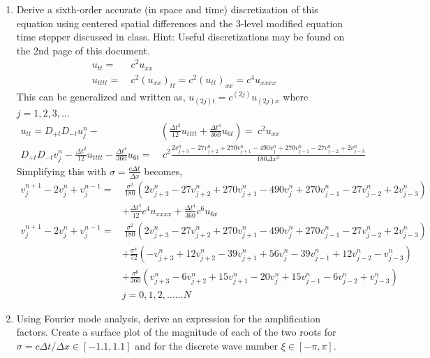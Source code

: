 \documentclass[11pt]{article}
\newcommand{\Dpt}{D_{+t}}
\newcommand{\Dmt}{D_{-t}}
\newcommand{\dx}{\Delta x}
\newcommand{\dt}{\Delta t}
\newcommand{\dis}[3]{{#1}^{#2}_{#3}}
\newcommand{\vd}[2]{v^{#1}_{#2}}
\newcommand{\vnd}[1]{v^{n}_{#1}}
\newcommand{\bra}[1]{\left(#1\right)}
\begin{document}
\begin{enumerate}
    \begin{enumerate}
      \item {\color{blue}Derive a sixth-order accurate (in space and time) discretization of this equation using centered spatial differences and the 3-level modified equation time stepper discussed in class. Hint: Useful discretizations may be found on the 2nd page of this document.}
      \begin{align*}
          u_{tt} =& \ c^2 u_{xx} \\
          u_{tttt} =& \ c^2 \bra{u_{xx}}_{tt} = c^2 \bra{u_{tt}}_{xx} = c^4 u_{xxxx}
      \end{align*}
      This can be generalized and written as, $u_{(2j)t} = c^{(2j)}u_{(2j)x}$ where $j=1,2,3,...$
      \begin{align*}
          u_{tt} = \Dpt\Dmt\dis{u}{n}{j}- &\bra{\frac{\dt^2}{12}u_{tttt}+\frac{\dt^4}{360}u_{6t}} = \ c^2 u_{xx} \\
          \Dpt\Dmt \dis{v}{n}{j} - \frac{\dt^2}{12}u_{tttt}-\frac{\dt^4}{360}u_{6t} =& \ c^2 \frac{2\vd{n}{j+3}-27\vd{n}{j+2}+270\vd{n}{j+1}-490\vd{n}{j}+270\vd{n}{j-1}-27\vd{n}{j-2}+2\vd{n}{j-3}}{180\dx^2}
      \end{align*}
      Simplifying this with $\sigma = \frac{c\dt}{\dx}$ becomes,
      \begin{align*}
          \vd{n+1}{j}-2\vnd{j}+\vd{n-1}{j} =& \ \frac{\sigma^2}{180}\bra{2\vd{n}{j+3}-27\vd{n}{j+2}+270\vd{n}{j+1}-490\vd{n}{j}+270\vd{n}{j-1}-27\vd{n}{j-2}+2\vd{n}{j-3}} \\
          & + \frac{\dt^2}{12}c^4 u_{xxxx} + \frac{\dt^4}{360}c^6u_{6x} \\
          \vd{n+1}{j}-2\vnd{j}+\vd{n-1}{j} =& \ \frac{\sigma^2}{180}\bra{2\vd{n}{j+3}-27\vd{n}{j+2}+270\vd{n}{j+1}-490\vd{n}{j}+270\vd{n}{j-1}-27\vd{n}{j-2}+2\vd{n}{j-3}} \\
          & + \frac{\sigma^4}{72} \bra{-\vnd{j+3}+12\vnd{j+2}-39\vnd{j+1}+56\vnd{j}-39\vnd{j-1}+12\vnd{j-2}-\vnd{j-3}}\\
          & + \frac{\sigma^6}{360}\bra{\vnd{j+3}-6\vnd{j+2}+15\vnd{j+1}-20\vnd{j}+15\vnd{j-1}-6\vnd{j-2}+\vnd{j-3}} \\
          & j=0,1,2,\ldots \ldots N
      \end{align*}
      \item{\color{blue} Using Fourier mode analysis, derive an expression for the amplification factors. Create a surface plot of the magnitude of each of the two roots for $\sigma=c\Delta t/\Delta x\in[-1.1,1.1]$ and for the discrete wave number $\xi\in[-\pi,\pi]$.}\\

\end{enumerate}
\end{enumerate}
\end{document}

